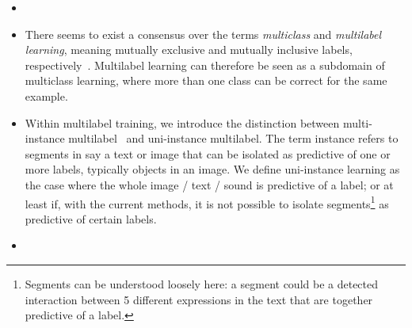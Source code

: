 \begin{itemize}[leftmargin=*]
\item {}

\item {}

There seems to exist a consensus over the terms \emph{multiclass} and \emph{multilabel learning}, meaning mutually exclusive and mutually inclusive labels, respectively~\cite{multilabelMethods}. Multilabel learning can therefore be seen as a subdomain of multiclass learning, where more than one class can be correct for the same example. 

\item {}

Within multilabel training, we introduce the distinction between multi-instance multilabel~\citep[e.g.,][]{multiInstance, multiInstanceMultiLabel} and uni-instance multilabel. The term instance refers to segments in say a text or image that can be isolated as predictive of one or more labels, typically objects in an image. We define uni-instance learning as the case where the whole image / text / sound is predictive of a label; or at least if, with the current methods, it is not possible to isolate segments\footnote{Segments can be understood loosely here: a segment could be a detected interaction between 5 different expressions in the text that are together predictive of a label.} as predictive of certain labels.


\item {}
\end{itemize}




